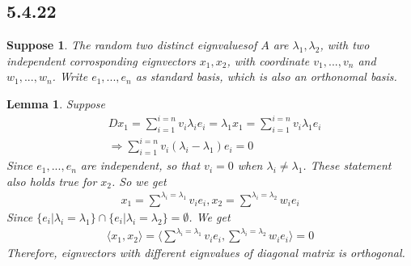 \documentclass{article}
\newtheorem*{suppose}{Suppose}
\newtheorem*{lemma}{Lemma}
\begin{document}
\subsection*{5.4.22}
\begin{suppose}
    The random two distinct eignvaluesof $A$ are $\lambda_1, \lambda_2$, with two independent corrosponding eignvectors $x_1, x_2$, with 
    coordinate $v_1, ..., v_n$ and $w_1, ..., w_n$. Write $e_1, ..., e_n$ as standard basis, which is also an orthonomal basis.
\end{suppose}
\begin{lemma}
    Suppose
    \begin{equation*}
        \begin{split}
            & Dx_1 = \sum_{i = 1}^{i = n} v_i \lambda_i e_i = \lambda_1x_1 = \sum_{i = 1}^{i = n} v_i \lambda_1 e_i \\
            & \Rightarrow \sum_{i = 1}^{i = n} v_i (\lambda_i - \lambda_1) e_i = 0
        \end{split}
    \end{equation*}
    Since $e_1, ..., e_n$ are independent, so that $v_i = 0$ when $\lambda_i \ne \lambda_1$. These statement also holds true for $x_2$. So we get 
    \begin{equation*}
        \begin{split}
            x_1 = \stackrel{\lambda_i = \lambda_1}{\sum} v_ie_i, x_2 =  \stackrel{\lambda_i = \lambda_2}{\sum} w_ie_i
        \end{split}
    \end{equation*}
    Since $\{e_i | \lambda_i = \lambda_1\} \cap \{e_i | \lambda_i = \lambda_2\} = \emptyset$.
    We get \begin{equation*}
        \begin{split}
            \langle x_1, x_2 \rangle = \langle \stackrel{\lambda_i = \lambda_1}{\sum} v_ie_i, \stackrel{\lambda_i = \lambda_2}{\sum} w_ie_i\rangle = 0
        \end{split}
    \end{equation*}
    Therefore, eignvectors with different eignvalues of diagonal matrix is orthogonal.
\end{lemma}
\end{document}
